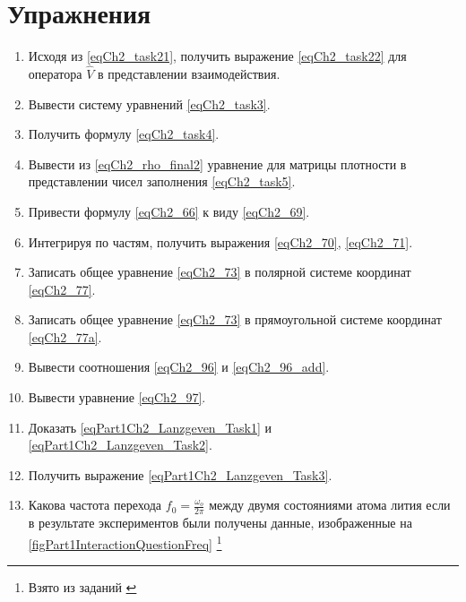 \section{Упражнения}
\begin{enumerate}
\item Исходя из \eqref{eqCh2_task21}, получить выражение
  \eqref{eqCh2_task22} для оператора $\hat{V}$ в представлении
  взаимодействия. 
\item Вывести систему уравнений \eqref{eqCh2_task3}.
\item Получить формулу \eqref{eqCh2_task4}.
\item Вывести из \eqref{eqCh2_rho_final2} уравнение для матрицы
  плотности в представлении чисел заполнения \eqref{eqCh2_task5}. 
\item Привести формулу \eqref{eqCh2_66} к виду \eqref{eqCh2_69}.
\item Интегрируя по частям, получить выражения \eqref{eqCh2_70},
  \eqref{eqCh2_71}.
\item Записать общее уравнение \eqref{eqCh2_73} в полярной системе
  координат \eqref{eqCh2_77}. 
\item Записать общее уравнение \eqref{eqCh2_73} в прямоугольной
  системе координат \eqref{eqCh2_77a}. 
\item Вывести соотношения \eqref{eqCh2_96} и \eqref{eqCh2_96_add}.
\item Вывести уравнение \eqref{eqCh2_97}.
\item Доказать \eqref{eqPart1Ch2_Lanzgeven_Task1} и \eqref{eqPart1Ch2_Lanzgeven_Task2}.
\item Получить выражение \eqref{eqPart1Ch2_Lanzgeven_Task3}.
\item \label{qInteractionFreq} Какова частота перехода $f_0 = \frac{\omega_o}{2 \pi}$ между двумя
  состояниями атома лития если в результате экспериментов были
  получены данные, изображенные на
  \autoref{figPart1InteractionQuestionFreq} \footnote{Взято из
    заданий \cite{courseIntroQuantumOpticsCoursera}} 
\end{enumerate}

 
